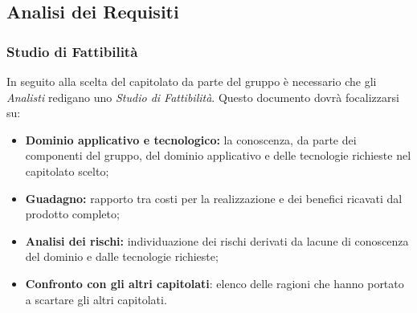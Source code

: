 \subsection{Analisi dei Requisiti}
\subsubsection{Studio di Fattibilità}
In seguito alla scelta del capitolato da parte del gruppo è necessario che gli \textit{Analisti} redigano uno \textit{Studio di Fattibilità}. Questo documento dovrà focalizzarsi su:
\begin{itemize}
\item \textbf{Dominio applicativo e tecnologico:} la conoscenza, da parte dei componenti del gruppo, del dominio applicativo e delle tecnologie richieste nel capitolato scelto; 
\item \textbf{Guadagno:} rapporto tra costi per la realizzazione e dei benefici ricavati dal prodotto completo;
\item \textbf{Analisi dei rischi:} individuazione dei rischi derivati da lacune di conoscenza del dominio e dalle tecnologie richieste;
\item \textbf{Confronto con gli altri capitolati}: elenco delle ragioni che hanno portato a scartare gli altri capitolati.
\end{itemize}
